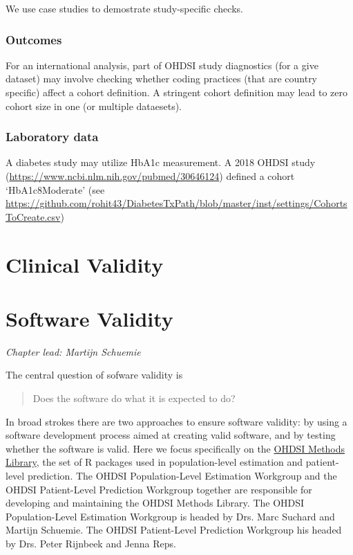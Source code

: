 \documentclass[11pt]{book}
\begin{document}
We use case studies to demostrate study-specific checks.

\subsection{Outcomes}\label{outcomes}

For an international analysis, part of OHDSI study diagnostics (for a
give dataset) may involve checking whether coding practices (that are
country specific) affect a cohort definition. A stringent cohort
definition may lead to zero cohort size in one (or multiple dataesets).

\subsection{Laboratory data}\label{laboratory-data}

A diabetes study may utilize HbA1c measurement. A 2018 OHDSI study
(\url{https://www.ncbi.nlm.nih.gov/pubmed/30646124}) defined a cohort
`HbA1c8Moderate' (see
\url{https://github.com/rohit43/DiabetesTxPath/blob/master/inst/settings/CohortsToCreate.csv})

\chapter{Clinical Validity}\label{ClinicalValidity}

\chapter{Software Validity}\label{SoftwareValidity}

\emph{Chapter lead: Martijn Schuemie}

The central question of sofware validity is

\begin{quote}
Does the software do what it is expected to do?
\end{quote}

In broad strokes there are two approaches to ensure software validity:
by using a software development process aimed at creating valid
software, and by testing whether the software is valid. Here we focus
specifically on the \href{https://ohdsi.github.io/MethodsLibrary/}{OHDSI
Methods Library}, the set of R packages used in population-level
estimation and patient-level prediction. The OHDSI Population-Level
Estimation Workgroup and the OHDSI Patient-Level Prediction Workgroup
together are responsible for developing and maintaining the OHDSI
Methods Library. The OHDSI Population-Level Estimation Workgroup is
headed by Drs. Marc Suchard and Martijn Schuemie. The OHDSI
Patient-Level Prediction Workgroup his headed by Drs. Peter Rijnbeek and
Jenna Reps.
\end{document}
